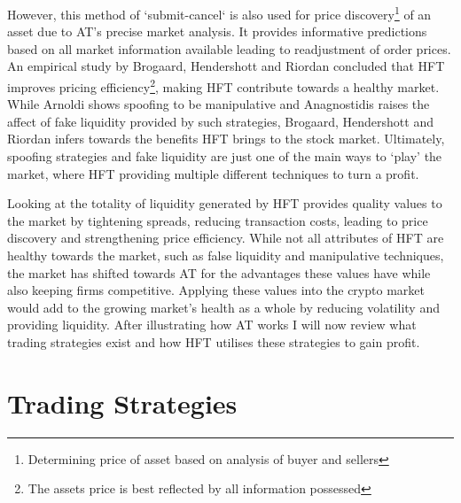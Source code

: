 However, this method of `submit-cancel` is also used for price discovery\footnote{Determining price of asset based on analysis of buyer and sellers} of an asset due to AT's precise market analysis. It provides informative predictions based on all market information available leading to readjustment of order prices. An empirical study by Brogaard, Hendershott and Riordan \cite{UNPUB:Brogaard:2017} concluded that HFT improves pricing efficiency\footnote{The assets price is best reflected by all information possessed}, making HFT contribute towards a healthy market. While Arnoldi \cite{JOURNAL:Arnoldi:2016} shows spoofing to be manipulative and Anagnostidis \cite{UNPUB:Anagnostidis:2017} raises the affect of fake liquidity provided by such strategies, Brogaard, Hendershott and Riordan \cite{UNPUB:Brogaard:2017} infers towards the benefits HFT brings to the stock market. Ultimately, spoofing strategies and fake liquidity are just one of the main ways to `play' the market, where HFT providing multiple different techniques to turn a profit. 

Looking at the totality of liquidity generated by HFT provides quality values to the market by tightening spreads, reducing transaction costs, leading to price discovery and strengthening price efficiency. While not all attributes of HFT are healthy towards the market, such as false liquidity and manipulative techniques, the market has shifted towards AT for the advantages these values have while also keeping firms competitive. Applying these values into the crypto market would add to the growing market's health as a whole by reducing volatility and providing liquidity. After illustrating how AT works I will now review what trading strategies exist and how HFT utilises these strategies to gain profit.




\section{Trading Strategies}
\label{sec:related:tradingStrategies}


